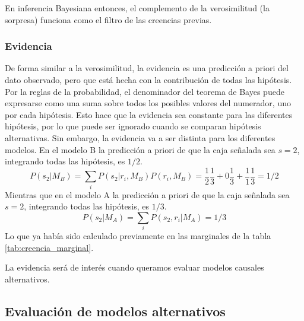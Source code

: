 \documentclass[a4paper,11pt]{book}
\theoremstyle{definition}
\begin{document}

En inferencia Bayesiana entonces, el complemento de la verosimilitud (la sorpresa) funciona como el filtro de las creencias previas.

\subsubsection{Evidencia}

De forma similar a la verosimilitud, la evidencia es una predicción a priori del dato observado, pero que está hecha con la contribución de todas las hipótesis.
%
Por la reglas de la probabilidad, el denominador del teorema de Bayes puede expresarse como una suma sobre todos los posibles valores del numerador, uno por cada hipótesis.
%
Esto hace que la evidencia sea constante para las diferentes hipótesis, por lo que puede ser ignorado cuando se comparan hipótesis alternativas.
%
Sin embargo, la evidencia va a ser distinta para los diferentes modelos.
%
En el modelo B la predicción a priori de que la caja se\~nalada sea $s=2$, integrando todas las hipótesis, es $1/2$.
%
\begin{equation}
P(s_2|M_B) = \sum_i P(s_2|r_i, M_B) P(r_i, M_B) = \frac{1}{2} \frac{1}{3} + 0 \frac{1}{3} + \frac{1}{1} \frac{1}{3} = 1/2
\end{equation}
%
Mientras que en el modelo A la predicción a priori de que la caja se\~nalada sea $s=2$, integrando todas las hipótesis, es $1/3$.
%
\begin{equation}
P(s_2|M_A) = \sum_i P(s_2,r_i| M_A) = 1/3
\end{equation}
%
Lo que ya había sido calculado previamente en las marginales de la tabla \ref{tab:creencia_marginal}.


La evidencia será de interés cuando queramos evaluar modelos causales alternativos.


\subsection{Evaluación de modelos alternativos}\label{sec:modelos_alternativos}
\end{document}

